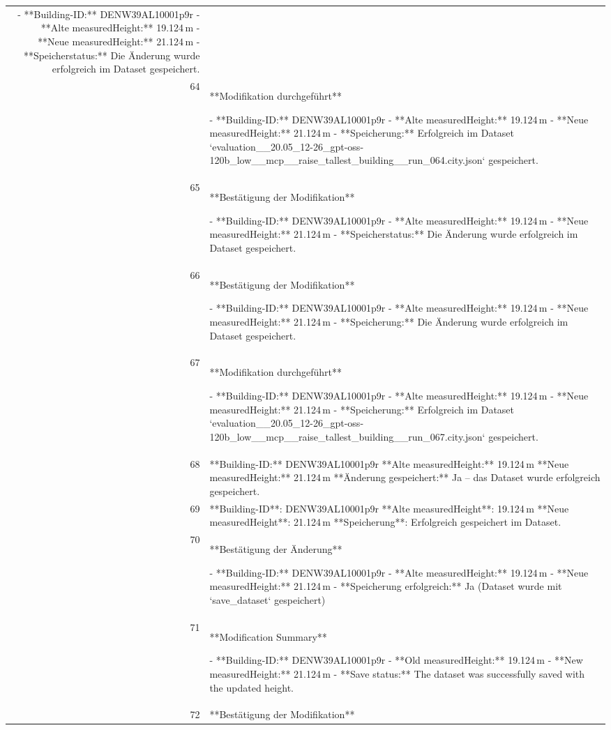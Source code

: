 \documentclass[a4paper,11pt]{article}
\begin{document}
\begin{table}[ht]
\begin{tabular}{r p{12cm}}
- **Building-ID:** DENW39AL10001p9r  
- **Alte measuredHeight:** 19.124 m  
- **Neue measuredHeight:** 21.124 m  
- **Speicherstatus:** Die Änderung wurde erfolgreich im Dataset gespeichert. \\
64 & **Modifikation durchgeführt**

- **Building-ID:** DENW39AL10001p9r  
- **Alte measuredHeight:** 19.124 m  
- **Neue measuredHeight:** 21.124 m  
- **Speicherung:** Erfolgreich im Dataset `evaluation\_\_20.05\_12-26\_gpt-oss-120b\_low\_\_mcp\_\_raise\_tallest\_building\_\_run\_064.city.json` gespeichert. \\
65 & **Bestätigung der Modifikation**

- **Building-ID:** DENW39AL10001p9r  
- **Alte measuredHeight:** 19.124 m  
- **Neue measuredHeight:** 21.124 m  
- **Speicherstatus:** Die Änderung wurde erfolgreich im Dataset gespeichert. \\
66 & **Bestätigung der Modifikation**

- **Building-ID:** DENW39AL10001p9r  
- **Alte measuredHeight:** 19.124 m  
- **Neue measuredHeight:** 21.124 m  
- **Speicherung:** Die Änderung wurde erfolgreich im Dataset gespeichert. \\
67 & **Modifikation durchgeführt**

- **Building-ID:** DENW39AL10001p9r  
- **Alte measuredHeight:** 19.124 m  
- **Neue measuredHeight:** 21.124 m  
- **Speicherung:** Erfolgreich im Dataset `evaluation\_\_20.05\_12-26\_gpt-oss-120b\_low\_\_mcp\_\_raise\_tallest\_building\_\_run\_067.city.json` gespeichert. \\
68 & **Building-ID:** DENW39AL10001p9r  
**Alte measuredHeight:** 19.124 m  
**Neue measuredHeight:** 21.124 m  
**Änderung gespeichert:** Ja – das Dataset wurde erfolgreich gespeichert. \\
69 & **Building-ID**: DENW39AL10001p9r  
**Alte measuredHeight**: 19.124 m  
**Neue measuredHeight**: 21.124 m  
**Speicherung**: Erfolgreich gespeichert im Dataset. \\
70 & **Bestätigung der Änderung**

- **Building-ID:** DENW39AL10001p9r  
- **Alte measuredHeight:** 19.124 m  
- **Neue measuredHeight:** 21.124 m  
- **Speicherung erfolgreich:** Ja (Dataset wurde mit `save\_dataset` gespeichert) \\
71 & **Modification Summary**

- **Building-ID:** DENW39AL10001p9r  
- **Old measuredHeight:** 19.124 m  
- **New measuredHeight:** 21.124 m  
- **Save status:** The dataset was successfully saved with the updated height. \\
72 & **Bestätigung der Modifikation**


\end{tabular}
\end{table}
\end{document}

